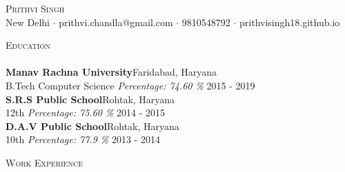 \documentclass[a4paper]{article}
\newcommand{\lineunder} {
    \vspace*{-8pt} \\
    \hspace*{-18pt} \hrulefill \\
}
\newcommand{\header} [1] {
    {\hspace*{-18pt}\vspace*{6pt} \textsc{#1}}
    \vspace*{-6pt} \lineunder
}
\begin{document}
\vspace*{-40pt}

    

\vspace*{-10pt}
\begin{center}
	{\Huge \scshape {Prithvi Singh}}\\
	New Delhi $\cdot$ prithvi.chandla@gmail.com $\cdot$ 9810548792 $\cdot$ prithvisingh18.github.io\\
\end{center}

\header{Education}
\textbf{Manav Rachna University}\hfill Faridabad, Haryana\\
B.Tech Computer Science \textit{Percentage: 74.60 \%} \hfill 2015 - 2019\\
\vspace{2mm}
\textbf{S.R.S Public School}\hfill Rohtak, Haryana\\
12th \textit{Percentage: 75.60 \%} \hfill 2014 - 2015\\
\vspace{2mm}
\textbf{D.A.V Public School}\hfill Rohtak, Haryana\\
10th \textit{Percentage: 77.9 \%} \hfill 2013 - 2014\\
\vspace{2mm}

\header{Work Experience}
\vspace{1mm}
\end{document}
